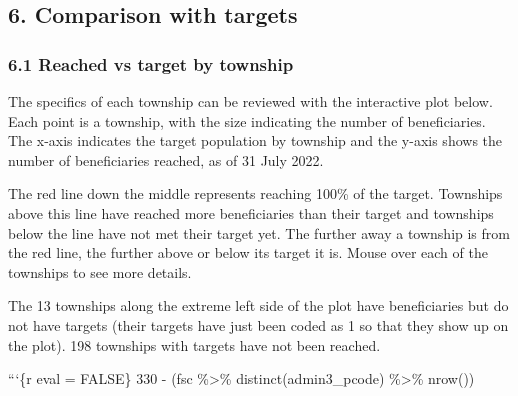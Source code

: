 \documentclass[
]{article}
\begin{document}
\hypertarget{comparison-with-targets}{%
\subsection{6. Comparison with targets}\label{comparison-with-targets}}

\hypertarget{reached-vs-target-by-township}{%
\subsubsection{6.1 Reached vs target by
township}\label{reached-vs-target-by-township}}

The specifics of each township can be reviewed with the interactive plot
below. Each point is a township, with the size indicating the number of
beneficiaries. The x-axis indicates the target population by township
and the y-axis shows the number of beneficiaries reached, as of 31 July
2022.

The red line down the middle represents reaching 100\% of the target.
Townships above this line have reached more beneficiaries than their
target and townships below the line have not met their target yet. The
further away a township is from the red line, the further above or below
its target it is. Mouse over each of the townships to see more details.

The 13 townships along the extreme left side of the plot have
beneficiaries but do not have targets (their targets have just been
coded as 1 so that they show up on the plot). 198 townships with targets
have not been reached.

```\{r eval = FALSE\} 330 - (fsc \%\textgreater\%
distinct(admin3\_pcode) \%\textgreater\% nrow())
\end{document}
